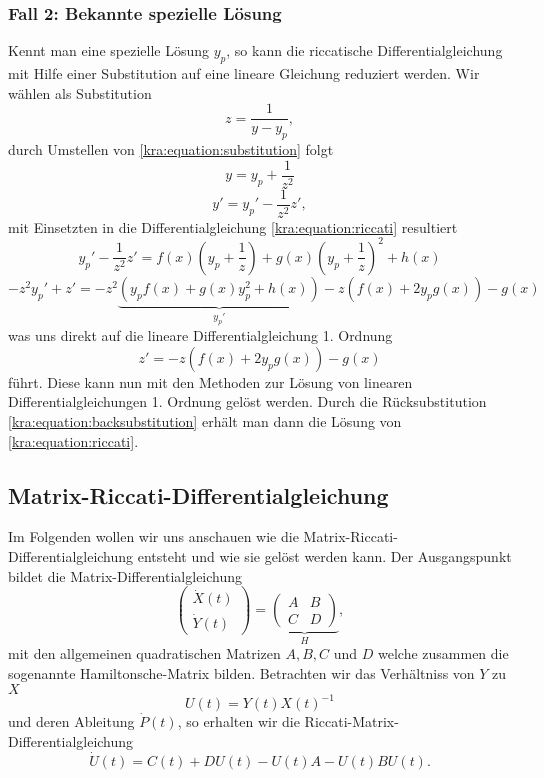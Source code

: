 \subsubsection{Fall 2: Bekannte spezielle Lösung}
Kennt man eine spezielle Lösung $y_p$, so kann die riccatische Differentialgleichung mit Hilfe einer Substitution auf eine lineare Gleichung reduziert werden.
Wir wählen als Substitution
\begin{equation} \label{kra:equation:substitution}
    z = \frac{1}{y - y_p},
\end{equation}
durch Umstellen von \eqref{kra:equation:substitution} folgt
\begin{equation}
    y = y_p + \frac{1}{z^2} \label{kra:equation:backsubstitution}
\end{equation}
\begin{equation}
    y' = y_p' - \frac{1}{z^2}z',
\end{equation}
mit Einsetzten in die Differentialgleichung \eqref{kra:equation:riccati} resultiert
\begin{equation}
    y_p' - \frac{1}{z^2}z' = f(x)(y_p + \frac{1}{z}) + g(x)(y_p + \frac{1}{z})^2 + h(x)
\end{equation}
\begin{equation}
    -z^{2}y_p' + z' = -z^2\underbrace{(y_{p}f(x) + g(x)y_p^2 + h(x))}_{\displaystyle{y_p'}} - z(f(x) + 2y_{p}g(x)) - g(x)
\end{equation}
was uns direkt auf die lineare Differentialgleichung 1. Ordnung
\begin{equation}
    z' = -z(f(x) + 2y_{p}g(x)) - g(x)
\end{equation}
führt.
Diese kann nun mit den Methoden zur Lösung von linearen Differentialgleichungen 1. Ordnung gelöst werden.
Durch die Rücksubstitution \eqref{kra:equation:backsubstitution} erhält man dann die Lösung von \eqref{kra:equation:riccati}.

\subsection{Matrix-Riccati-Differentialgleichung} \label{kra:loesung:riccati}
Im Folgenden wollen wir uns anschauen wie die Matrix-Riccati-Differentialgleichung entsteht und wie sie gelöst werden kann.
Der Ausgangspunkt bildet die Matrix-Differentialgleichung
\begin{equation}
    \label{kra:equation:matrix-dgl}
    \begin{pmatrix}
        \dot{X}(t) \\
        \dot{Y}(t)
    \end{pmatrix}
    =
    \underbrace{
        \begin{pmatrix}
            A & B \\
            C & D
        \end{pmatrix}
    }_{\displaystyle{H}},
\end{equation}
mit den allgemeinen quadratischen Matrizen $A, B, C$ und $D$ welche zusammen die sogenannte Hamiltonsche-Matrix bilden.
Betrachten wir das Verhältniss von $Y$ zu $X$
\[
    U(t) = Y(t)X(t)^{-1}
\]
und deren Ableitung $\dot{P}(t)$, so erhalten wir die Riccati-Matrix-Differentialgleichung
\[
    \dot{U}(t) = C(t)  + DU(t) - U(t)A - U(t)BU(t).
\]

